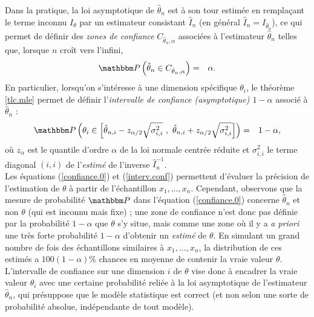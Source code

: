 Dans la pratique, la loi asymptotique de $\hat{\theta}_n$ est \`a son tour estim\'ee en rempla\c cant le terme inconnu $I_{\theta}$ par un estimateur consistant $\hat{I}_n$ (en g\'en\'eral $\hat{I}_n=I_{\hat{\theta}_n}$), ce qui permet de d\'efinir des {\it zones de confiance} $C_{\hat{\theta}_n,\alpha}$ associ\'ees \`a l'estimateur $\hat{\theta}_n$ telles que, lorsque $n$ cro\^it vers l'infini,
\begin{eqnarray}
\Pm\left(\hat{\theta}_n\in C_{\hat{\theta}_n,\alpha}\right) & = & \alpha. \label{confiance.0}
\end{eqnarray}
En particulier, lorsqu'on s'int\'eresse \`a une dimension sp\'ecifique $\theta_i$, le th\'eor\`eme \ref{tlc.mle} permet de d\'efinir l'{\it intervalle de confiance (asymptotique) $1-\alpha$} associ\'e \`a $\hat{\theta}_n$ : 
\begin{eqnarray}
\Pm\left(\theta_i\in\left[\hat{\theta}_{n,i} - z_{\alpha/2}\sqrt{\sigma^2_{i,i}} \ , \ \hat{\theta}_{n,i} + z_{\alpha/2}\sqrt{\sigma^2_{i,i}}\right]\right) & = & 1-\alpha, \label{interv.conf}
\end{eqnarray}
o\`u  $z_{\alpha}$ est le quantile d'ordre $\alpha$ de la loi normale centr\'ee r\'eduite et $\sigma^2_{i,i}$ le terme diagonal $(i,i)$ de l'{\it estim\'e} de l'inverse $\hat{I}^{-1}_n$. \\

 Les \'equations (\ref{confiance.0}) et (\ref{interv.conf}) permettent d'\'evaluer la pr\'ecision de l'estimation de $\theta$ \`a partir de l'\'echantillon $x_1,\ldots,x_n$. Cependant, observons que la mesure de probabilit\'e $\Pm$ dans l'\'equation (\ref{confiance.0}) concerne $\hat\theta_n$ et non $\theta$ (qui est inconnu mais fixe) ; une zone de confiance n'est donc pas d\'efinie par la probabilit\'e $1-\alpha$ que $\theta$ s'y situe, mais comme une zone o\`u il y a {\it a priori} une tr\`es forte probabilit\'e $1-\alpha$ d'obtenir un {\it estim\'e} de $\theta$. En simulant un  grand nombre de fois des \'echantillons similaires \`a $x_1,\ldots,x_n$, la distribution de ces estim\'es a $100(1-\alpha)\%$ chances en moyenne de contenir la vraie valeur $\theta$. L'intervalle de confiance sur une dimension $i$ de $\theta$ vise donc \`a encadrer la vraie valeur $\theta_i$ avec une certaine probabilit\'e reli\'ee \`a la loi asymptotique de l'estimateur $\hat{\theta}_n$, qui pr\'esuppose que le mod\`ele statistique est correct  (et non selon une sorte de probabilit\'e absolue, ind\'ependante de tout mod\`ele). \\  




